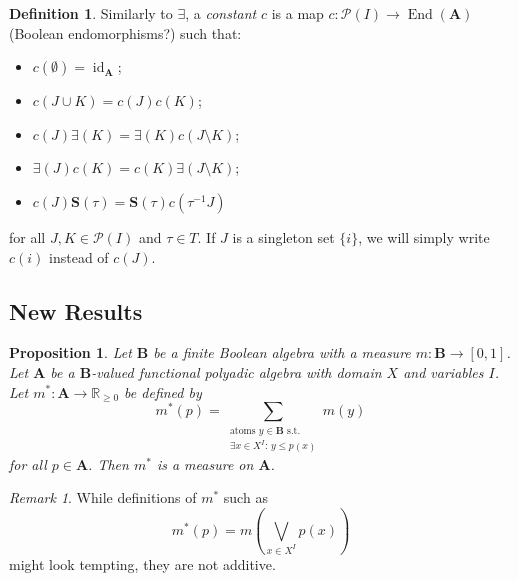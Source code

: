 \documentclass{article}
\newtheorem{proposition}{Proposition}
\theoremstyle{definition}
\newtheorem{definition}{Definition}
\theoremstyle{remark}
\newtheorem*{remark}{Remark}
\DeclareMathOperator{\id}{id}
\DeclareMathOperator{\End}{End}
\begin{document}
\begin{definition}
  Similarly to $\bm\exists$, a \emph{constant} $c$ is a map $c: \mathcal{P}(I)
  \to \End(\mathbf{A})$ (Boolean endomorphisms?) such that:
  \begin{itemize}
  \item $c(\emptyset) = \id_{\mathbf{A}}$;
  \item $c(J \cup K) = c(J)c(K)$;
  \item $c(J)\bm\exists(K) = \bm\exists(K)c(J \setminus K)$;
  \item $\bm\exists(J)c(K) = c(K)\bm\exists(J \setminus K)$;
  \item $c(J)\mathbf{S}(\tau) = \mathbf{S}(\tau)c(\tau^{-1}J)$
  \end{itemize}
  for all $J, K \in \mathcal{P}(I)$ and $\tau \in T$. If $J$ is a singleton
  set $\{ i \}$, we will simply write $c(i)$ instead of $c(J)$.
\end{definition}

\subsection{New Results}

\begin{proposition} \label{prop:polyadic_measure}
  Let $\mathbf{B}$ be a finite Boolean algebra with a measure $m :
  \mathbf{B} \to [0, 1]$. Let $\mathbf{A}$ be a $\mathbf{B}$-valued functional
  polyadic algebra with domain $X$ and variables $I$. Let $m^* : \mathbf{A} \to
  \mathbb{R}_{\ge 0}$ be defined by
  \[
    m^*(p) = \sum_{\substack{\text{atoms }y \in \mathbf{B} \text{ s.t.}\\ \exists x \in X^I:\, y \le p(x)}} m(y)
  \]
  for all $p \in \mathbf{A}$. Then $m^*$ is a measure on $\mathbf{A}$.
\end{proposition}

\begin{remark}
  While definitions of $m^*$ such as
  \[
    m^*(p) = m \left( \bigvee_{x \in X^I} p(x) \right)
  \]
  might look tempting, they are not additive.
\end{remark}
\end{document}
